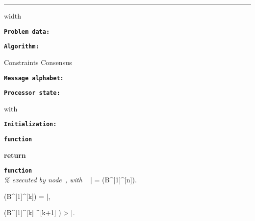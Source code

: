 \documentclass[onecolumn,journal,letterpaper]{IEEEtran}
\newcommand{\union}{\cup}
\newcommand{\supind}[2]{{#1}^{[#2]}}
\begin{document}
\bigskip \hrule width \linewidth \smallskip

\noindent\begin{minipage}{0.44\linewidth}\textbf{\texttt{Problem data:}}\end{minipage}\begin{minipage}{0.56\linewidth}\end{minipage}

\noindent\begin{minipage}{0.44\linewidth}\textbf{\texttt{Algorithm:}}\end{minipage}\begin{minipage}{0.56\linewidth}Constraints Consensus\end{minipage}

\noindent\begin{minipage}{0.44\linewidth}\textbf{\texttt{Message alphabet:}}\end{minipage}\begin{minipage}{0.56\linewidth}\end{minipage}

\noindent\begin{minipage}{0.44\linewidth}\textbf{\texttt{Processor state:}}\end{minipage}\begin{minipage}{0.56\linewidth} with
  \end{minipage}

\noindent\begin{minipage}{0.44\linewidth}\textbf{\texttt{Initialization:}}\end{minipage}\begin{minipage}{0.56\linewidth}\end{minipage}

\bigskip

\noindent\textbf{\texttt{function}}  
\begin{algorithmic}[1]
  \STATE \textbf{return} 
\end{algorithmic}

\medskip

\noindent\textbf{\texttt{function}}   \\
\emph{\% executed by node~, with }\
     \label{eq:globalopt}
     \bar{\phi} = \phi(\supind{B}{1}\union\cdots \union \supind{B}{n}).
   
     \label{eq:no-idea}
     \phi(\supind{B}{1}\union\cdots \union \supind{B}{k})
     = \bar{\phi},
   
     \label{eq:absurb}
     \phi(\supind{B}{1}\union\cdots \union \supind{B}{k}
     \union \supind{B}{k+1} )
     > \bar{\phi}.
   
\end{document}
